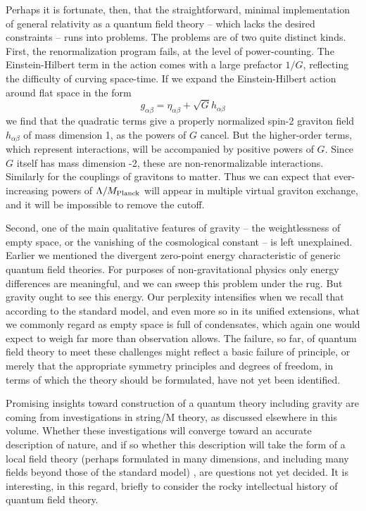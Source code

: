 \documentclass[12pt]{article}
\begin{document}
Perhaps it is fortunate, then, that the straightforward, minimal
implementation of general relativity as a quantum field theory --
which lacks the desired constraints -- runs into problems.  The
problems are of two quite distinct kinds.  First, the renormalization
program fails, at the level of power-counting.  The Einstein-Hilbert
term in the action comes with a large prefactor $1/G$, reflecting the
difficulty of curving space-time.  If we expand the Einstein-Hilbert
action around flat space in the form
\begin{equation}
g_{\alpha \beta} =
\eta_{\alpha\beta} +  \sqrt G h_{\alpha\beta}
\end{equation}
we find
that  the quadratic terms give a properly normalized spin-2  graviton
field $h_{\alpha\beta}$ of mass dimension 1, as the powers of $G$
cancel.   But the higher-order terms, which represent interactions,
will be accompanied by positive powers of $G$.  Since $G$ itself has
mass dimension -2, these are non-renormalizable interactions.
Similarly for the couplings of gravitons to matter.  Thus we can expect
that ever-increasing powers of $\Lambda/M_{\rm Planck}$ will appear in
multiple virtual graviton exchange, and it will be impossible to
remove the cutoff.  

Second, one of the main qualitative features of
gravity -- the weightlessness of empty space, or the vanishing of the
cosmological constant -- is left unexplained.   Earlier we mentioned
the divergent zero-point energy characteristic of generic quantum
field theories.  For  purposes of non-gravitational physics only energy
differences are meaningful, and we can sweep this problem under the
rug.  But gravity ought  to see this energy.   Our perplexity
intensifies  when we recall that according to the standard model, and
even more so in its unified extensions, what we commonly regard as
empty space is full of condensates, which again one would expect to
weigh far more than observation allows.  The failure, so far, of
quantum field theory to meet these challenges might reflect a basic
failure of principle, or merely that the appropriate symmetry
principles and degrees of freedom, in terms of which the theory should
be formulated, have not yet been identified.   

Promising insights toward construction of a quantum theory including
gravity are coming from investigations in string/M theory, as
discussed elsewhere in this volume.  Whether these investigations will
converge toward an accurate description of nature, and if so whether
this description will take the form of a local field theory (perhaps
formulated in many dimensions, and including many fields beyond those
of the standard model) , are questions not yet decided.  It is
interesting, in this regard, briefly to consider the rocky
intellectual history of quantum field theory.
\end{document}
